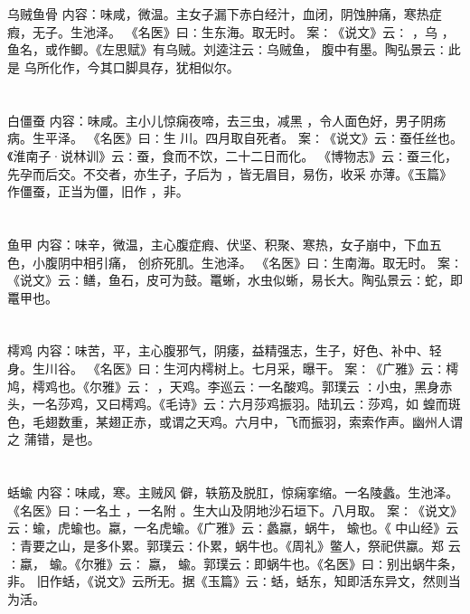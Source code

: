 \documentclass[12pt,UTF8]{ctexbook}
\begin{document}
\section{}乌贼鱼骨
内容：味咸，微温。主女子漏下赤白经汁，血闭，阴蚀肿痛，寒热症瘕，无子。生池泽。 
《名医》曰∶生东海。取无时。 
案∶《说文》云∶ ，乌 ，鱼名，或作鲫。《左思赋》有乌贼。刘逵注云∶乌贼鱼， 
腹中有墨。陶弘景云∶此是 乌所化作，今其口脚具存，犹相似尔。 


\section{}白僵蚕
内容：味咸。主小儿惊痫夜啼，去三虫，减黑 ，令人面色好，男子阴疡病。生平泽。 
《名医》曰∶生 川。四月取自死者。 
案∶《说文》云∶蚕任丝也。《淮南子·说林训》云∶蚕，食而不饮，二十二日而化。 
《博物志》云∶蚕三化，先孕而后交。不交者，亦生子，子后为 ，皆无眉目，易伤，收采 
亦薄。《玉篇》作僵蚕，正当为僵，旧作 ，非。 


\section{}鱼甲
内容：味辛，微温，主心腹症瘕、伏坚、积聚、寒热，女子崩中，下血五色，小腹阴中相引痛， 
创疥死肌。生池泽。 
《名医》曰∶生南海。取无时。 
案∶《说文》云∶鳝，鱼石，皮可为鼓。鼍蜥，水虫似蜥，易长大。陶弘景云∶蛇，即 
鼍甲也。 


\section{}樗鸡
内容：味苦，平，主心腹邪气，阴痿，益精强志，生子，好色、补中、轻身。生川谷。 
《名医》曰∶生河内樗树上。七月采，曝干。 
案∶《广雅》云∶樗鸠，樗鸡也。《尔雅》云∶ ，天鸡。李巡云∶一名酸鸡。郭璞云 
∶小虫，黑身赤头，一名莎鸡，又曰樗鸡。《毛诗》云∶六月莎鸡振羽。陆玑云∶莎鸡，如 
蝗而斑色，毛翅数重，某翅正赤，或谓之天鸡。六月中，飞而振羽，索索作声。幽州人谓之 
蒲错，是也。 


\section{}蛞蝓
内容：味咸，寒。主贼风 僻，轶筋及脱肛，惊痫挛缩。一名陵蠡。生池泽。 
《名医》曰∶一名土 ，一名附 。生大山及阴地沙石垣下。八月取。 
案∶《说文》云∶蝓，虎蝓也。蠃，一名虎蝓。《广雅》云∶蠡蠃，蜗牛， 蝓也。《 
中山经》云∶青要之山，是多仆累。郭璞云∶仆累，蜗牛也。《周礼》鳖人，祭祀供蠃。郑 
云∶蠃， 蝓。《尔雅》云∶ 蠃， 蝓。郭璞云∶即蜗牛也。《名医》曰∶别出蜗牛条，非。 
旧作蛞，《说文》云所无。据《玉篇》云∶蛞，蛞东，知即活东异文，然则当为活。 
\end{document}
